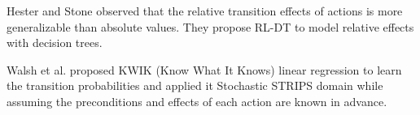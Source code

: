 Hester and Stone \cite{Hester09} observed that the relative transition effects of actions
is more generalizable than absolute values. They propose RL-DT to model relative
effects with decision trees.

Walsh et al. \cite{Walsh09} proposed KWIK (Know What It Knows) linear regression
to learn the transition probabilities and applied it Stochastic STRIPS domain while
assuming the preconditions and effects of each action are known in advance. 











